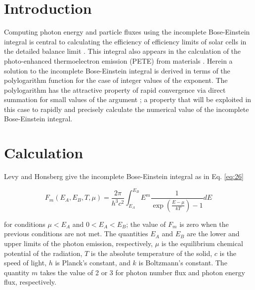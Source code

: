 \documentclass[letterpaper,12pt]{article}
\title{\Title}
\author{\AuthorName}
\begin{document}
\maketitle


\begin{abstract}
The canonical incomplete Bose-Einstein integral is expressed in terms of a finite sum of polylogarithm functions.
\end{abstract}


\section{Introduction}
Computing photon energy and particle fluxes using the incomplete Bose-Einstein integral is central to calculating the efficiency of efficiency limits of solar cells in the detailed balance limit \cite{10.1063/1.1736034}. This integral also appears in the calculation of the photo-enhanced thermoelectron emission (PETE) from materials \cite{10.1038/nmat2814}. Herein a solution to the incomplete Bose-Einstein integral is derived in terms of the polylogarithm function for the case of integer values of the exponent. The polylogarithm has the attractive property of rapid convergence via direct summation for small values of the argument \cite{http://academic.reed.edu/physics/faculty/crandall/papers/Polylog}; a property that will be exploited in this case to rapidly and precisely calculate the numerical value of the incomplete Bose-Einstein integral.


\section{Calculation}
Levy and Honsberg \cite{10.1016/j.sse.2006.06.017} give the incomplete Bose-Einstein integral as in Eq. \ref{eq:26}

\begin{equation} \label{eq:26}
F_{m}(E_{A},E_{B},T,\mu) = \frac{2 \pi}{h^{3}c^{2}} \int_{E_{A}}^{E_{B}} E^{m} \frac{1}{\exp \left( \frac{E - \mu}{kT} \right) - 1} dE 
\end{equation}


\noindent for conditions $\mu < E_{A}$ and $0 < E_{A} < E_{B}$; the value of $F_{m}$ is zero when the previous conditions are not met. The quantities $E_{A}$ and $E_{B}$ are the lower and upper limits of the photon emission, respectively, $\mu$ is the equilibrium chemical potential of the radiation, $T$ is the absolute temperature of the solid, $c$ is the speed of light, $h$ is Planck's constant, and $k$ is Boltzmann's constant. The quantity $m$ takes the value of 2 or 3 for photon number flux and photon energy flux, respectively.
\end{document}

